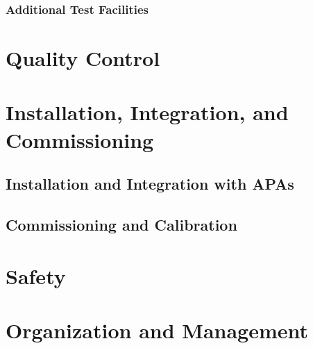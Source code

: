 \subsubsection{Additional Test Facilities}
\label{sec:fdsp-tpc-elec-qa-facilities-other}



\section{Quality Control}
\label{sec:fdsp-tpc-elec-qc}



\section{Installation, Integration, and Commissioning}
\label{sec:fdsp-tpc-elec-install}


\subsection{Installation and Integration with APAs}
\label{sec:fdsp-tpc-elec-install-apa}


\subsection{Commissioning and Calibration}
\label{sec:fdsp-tpc-elec-install-calib}



\section{Safety}
\label{sec:fdsp-tpc-elec-safety}



\section{Organization and Management}
\label{sec:fdsp-tpc-elec-org}


